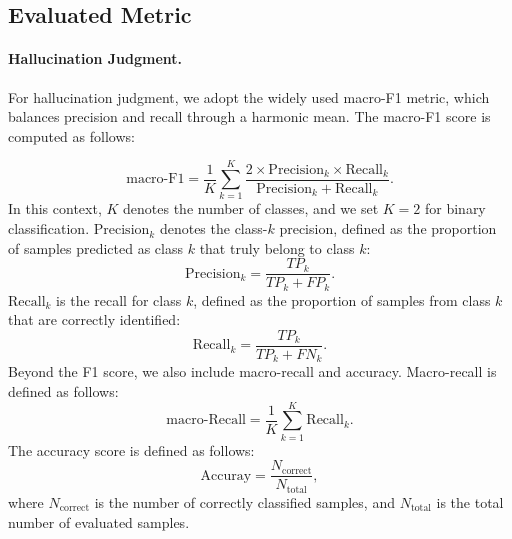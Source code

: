 \subsection{Evaluated Metric}
\label{appendix_evaluation_metric}
\paragraph{Hallucination Judgment.} 
For hallucination judgment, we adopt the widely used macro-F1 metric, which balances precision and recall through a harmonic mean. The macro-F1 score is computed as follows:

\begin{equation}
   \mathrm{macro\text{-}F1} = \frac{1}{K} \sum_{k=1}^{K} \frac{2\times \mathrm{Precision}_k\times \mathrm{Recall}_k}{\mathrm{Precision}_k+\mathrm{Recall}_k}.
\end{equation}
In this context, $K$ denotes the number of classes, and we set $K=2$ for binary classification. $\mathrm{Precision}_k$ denotes the class-$k$ precision, defined as the proportion of samples predicted as class $k$ that truly belong to class $k$:
\begin{equation}
      \mathrm{Precision}_k = \frac{TP_k}{TP_k + FP_k}.
\end{equation}
$\mathrm{Recall}_k$ is the recall for class $k$, defined as the proportion of samples from class $k$ that are correctly identified:
\begin{equation}
     \mathrm{Recall}_k = \frac{TP_k}{TP_k + FN_k}.
\end{equation}
Beyond the F1 score, we also include macro-recall and accuracy. Macro-recall is defined as follows:
\begin{equation}
   \mathrm{macro\text{-}Recall} = \frac{1}{K} \sum_{k=1}^{K} \mathrm{Recall}_k.
\end{equation}
The accuracy score is defined as follows:
\begin{equation}
   \mathrm{Accuray} = \frac{N_{\mathrm{correct}}}{N_{\mathrm{total}}},
\end{equation}
where $N_{\mathrm{correct}}$ is the number of correctly classified samples, and $N_{\mathrm{total}}$ is the total number of evaluated samples.


